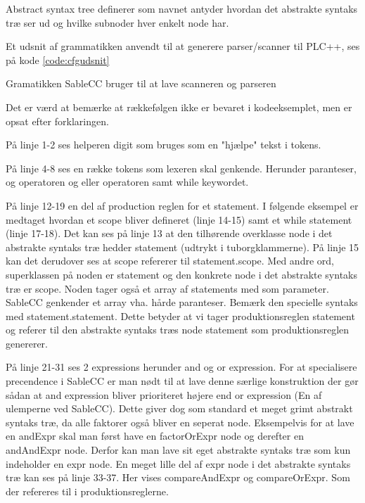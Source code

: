 Abstract syntax tree definerer som navnet antyder hvordan det abstrakte syntaks træ ser ud og hvilke subnoder hver enkelt node har.

Et udsnit af grammatikken anvendt til at generere parser/scanner til PLC++, ses på kode \ref{code:cfgudsnit}

Gramatikken SableCC bruger til at lave scanneren og parseren


\noindent Det er værd at bemærke at rækkefølgen ikke er bevaret i kodeeksemplet, men er opsat efter forklaringen.

På linje 1-2 ses helperen digit som bruges som en "hjælpe" tekst i tokens.

På linje 4-8 ses en række tokens som lexeren skal genkende. Herunder paranteser, og operatoren og eller operatoren samt while keywordet.

På linje 12-19 en del af production reglen for et statement. I følgende eksempel er medtaget hvordan et scope bliver defineret (linje 14-15) samt et while statement (linje 17-18). Det kan ses på linje 13 at den tilhørende overklasse node i det abstrakte syntaks træ hedder statement (udtrykt i tuborgklammerne). På linje 15 kan det derudover ses at scope refererer til statement.scope. Med andre ord, superklassen på noden er statement og den konkrete node i det abstrakte syntaks træ er scope. Noden tager også et array af statements med som parameter. SableCC genkender et array vha. hårde paranteser. Bemærk den specielle syntaks med statement.statement. Dette betyder at vi tager produktionsreglen statement og referer til den abstrakte syntaks træs node statement som produktionsreglen genererer.

På linje 21-31 ses 2 expressions herunder and og or expression. For at specialisere precendence i SableCC er man nødt til at lave denne særlige konstruktion der gør sådan at and expression bliver prioriteret højere end or expression (En af ulemperne ved SableCC). Dette giver dog som standard et meget grimt abstrakt syntaks træ, da alle faktorer også bliver en seperat node. Eksempelvis for at lave en andExpr skal man først have en factorOrExpr node og derefter en andAndExpr node. Derfor kan man lave sit eget abstrakte syntaks træ som kun indeholder en expr node. En meget lille del af expr node i det abstrakte syntaks træ kan ses på linje 33-37. Her vises compareAndExpr og compareOrExpr. Som der refereres til i produktionsreglerne.

